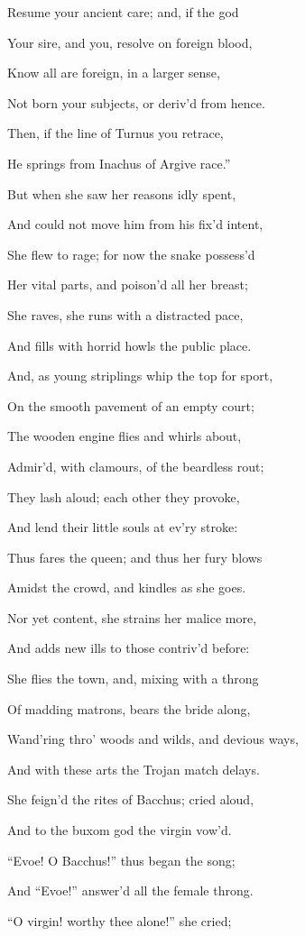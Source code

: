 Resume your ancient care; and, if the god

Your sire, and you, resolve on foreign blood,

Know all are foreign, in a larger sense,

Not born your subjects, or deriv’d from hence.

Then, if the line of Turnus you retrace,

He springs from Inachus of Argive race.”

But when she saw her reasons idly spent,

And could not move him from his fix’d intent,

She flew to rage; for now the snake possess’d

Her vital parts, and poison’d all her breast;

She raves, she runs with a distracted pace,

And fills with horrid howls the public place.

And, as young striplings whip the top for sport,

On the smooth pavement of an empty court;

The wooden engine flies and whirls about,

Admir’d, with clamours, of the beardless rout;

They lash aloud; each other they provoke,

And lend their little souls at ev’ry stroke:

Thus fares the queen; and thus her fury blows

Amidst the crowd, and kindles as she goes.

Nor yet content, she strains her malice more,

And adds new ills to those contriv’d before:

She flies the town, and, mixing with a throng

Of madding matrons, bears the bride along,

Wand’ring thro’ woods and wilds, and devious ways,

And with these arts the Trojan match delays.

She feign’d the rites of Bacchus; cried aloud,

And to the buxom god the virgin vow’d.

“Evoe! O Bacchus!” thus began the song;

And “Evoe!” answer’d all the female throng.

“O virgin! worthy thee alone!” she cried;

